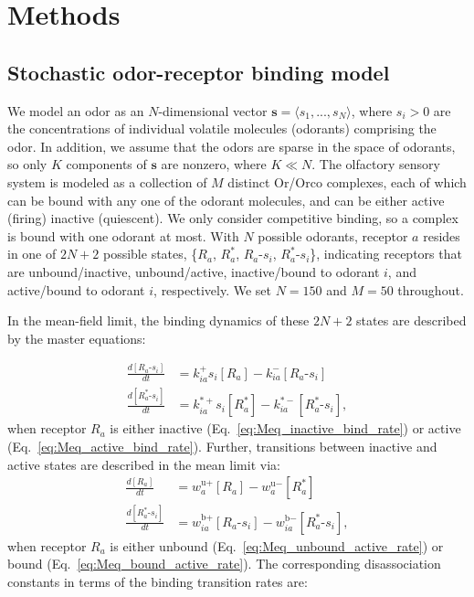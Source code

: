 



\section{Methods}

\subsection{Stochastic odor-receptor binding model}

We model an odor as an $N$-dimensional vector $\mathbf s = \langle s_1,...,s_N\rangle$, where $s_i > 0$ are the concentrations of individual volatile molecules (odorants) comprising the odor. In addition, we assume that the odors are sparse in the space of odorants, so only $K$ components of $\mathbf s$ are nonzero, where $K \ll N$. The olfactory sensory system is modeled as a collection of $M$ distinct Or/Orco complexes, each of which can be bound with any one of the odorant molecules, and can be either active (firing) inactive (quiescent). We only consider competitive binding, so a complex is bound with one odorant at most. With $N$ possible odorants, receptor $a$ resides in one of $2N+2$ possible states, \{$R_a$, $R^*_a$, $R_a$-$s_i$, $R^*_a$-$s_i$\}, indicating receptors that are unbound/inactive, unbound/active, inactive/bound to odorant $i$, and active/bound to odorant $i$, respectively. We set $N = 150$ and $M = 50$ throughout.

In the mean-field limit, the binding dynamics of these $2N + 2$ states are described by the master equations:

\begin{align}
\frac{d[R_a\text{-}s_i]}{dt} &= k^+_{ia}s_i[R_a] - k^-_{ia}[R_a\text{-}s_i] \label{eq:Meq_inactive_bind_rate}\\
\frac{d[R^*_a\text{-}s_i]}{dt} &= k^{*+}_{ia}s_i[R^*_a] - k^{*-}_{ia}[R^*_a\text{-}s_i],
\label{eq:Meq_active_bind_rate}
\end{align}
when receptor $R_a$ is either inactive (Eq.~\ref{eq:Meq_inactive_bind_rate}) or active (Eq.~\ref{eq:Meq_active_bind_rate}). Further, transitions between inactive and active states are described in the mean limit via:
\begin{align}
\frac{d[R_a]}{dt} &= w^{\text{u}+}_a [R_a] - w^{\text{u}-}_a [R^*_a] \label{eq:Meq_unbound_active_rate}\\
\frac{d[R^*_a\text{-}s_i]}{dt} &=  w^{\text{b}+}_{ia} [R_a\text{-}s_i] - w^{\text{b}-}_{ia}  [R^*_a\text{-}s_i],
\label{eq:Meq_bound_active_rate}
\end{align}
when receptor $R_a$ is either unbound (Eq.~\ref{eq:Meq_unbound_active_rate}) or bound (Eq.~\ref{eq:Meq_bound_active_rate}). The corresponding disassociation constants in terms of the binding transition rates are:


